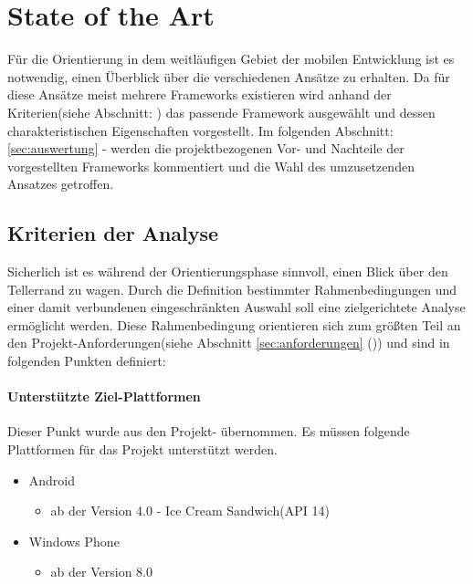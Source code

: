 \documentclass[../Bachelorarbeit.tex]{subfiles}
\begin{document}
\chapter{State of the Art}
\label{chap:state_of_the_art}

Für die Orientierung in dem weitläufigen Gebiet der mobilen Entwicklung ist es notwendig, einen Überblick über die verschiedenen Ansätze zu erhalten. 
Da für diese Ansätze meist mehrere Frameworks existieren wird anhand der Kriterien(siehe Abschnitt: ) das passende Framework ausgewählt und dessen charakteristischen Eigenschaften vorgestellt.
Im folgenden Abschnitt: \ref{sec:auswertung} -  werden die  projektbezogenen Vor- und Nachteile der vorgestellten Frameworks kommentiert und die Wahl des umzusetzenden Ansatzes getroffen.


\section{Kriterien der Analyse}
\label{sec:kriterien_der_analyse}

Sicherlich ist es während der Orientierungsphase sinnvoll, einen Blick über den Tellerrand zu wagen.
Durch die Definition bestimmter Rahmenbedingungen und einer damit verbundenen eingeschränkten Auswahl soll eine zielgerichtete Analyse ermöglicht werden.
Diese Rahmenbedingung orientieren sich zum größten Teil an den Projekt-Anforderungen(siehe Abschnitt \ref{sec:anforderungen} ()) und sind in folgenden Punkten definiert:

\subsubsection*{Unterstützte Ziel-Plattformen}
\label{subsub:supported_plattforms}
Dieser Punkt wurde aus den Projekt- übernommen. 
Es müssen folgende Plattformen für das Projekt unterstützt werden.


\begin{itemize}
\item Android
\begin{itemize}
\item ab der Version 4.0 - Ice Cream Sandwich(\ac{API} 14) 
\end{itemize}
\item Windows Phone
\begin{itemize}
\item ab der Version 8.0 
\end{itemize}
\end{itemize}
\end{document}
